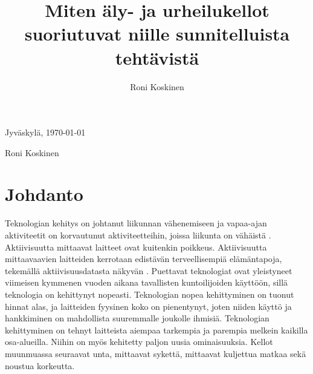 \documentclass[utf8,bachelor,finnish]{bachelor}
\begin{document}
\title{Miten äly- ja urheilukellot suoriutuvat niille sunnitelluista tehtävistä}

\author{Roni Koskinen}


\maketitle


Jyväskylä, \today

\bigskip

Roni Koskinen


\mainmatter


\chapter{Johdanto}
  Teknologian kehitys on johtanut liikunnan vähenemiseen ja vapaa-ajan aktiviteetit on korvautunut aktiviteetteihin, joissa liikunta on vähäistä \parencite{petrusevski_interventions_2021}.
   Aktiivisuutta mittaavat laitteet ovat kuitenkin poikkeus. Aktiivisuutta mittaavaavien laitteiden kerrotaan edistävän terveellisempiä elämäntapoja,
    tekemällä aktiivisuusdatasta näkyvän \parencite{shin2015understanding}.
     Puettavat teknologiat ovat yleistyneet viimeisen kymmenen vuoden aikana tavallisten kuntoilijoiden käyttöön, sillä teknologia on kehittynyt nopeasti.
      Teknologian nopea kehittyminen on tuonut hinnat alas, ja laitteiden fyysinen koko on pienentynyt, joten niiden käyttö ja hankkiminen on mahdollista suuremmalle joukolle ihmisiä.
       Teknologian kehittyminen on tehnyt laitteista aiempaa tarkempia ja parempia melkein kaikilla osa-alueilla. Niihin on myös kehitetty paljon uusia ominaisuuksia.
        Kellot muunmuassa seuraavat unta, mittaavat sykettä, mittaavat kuljettua matkaa sekä noustua korkeutta.\\
\end{document}
